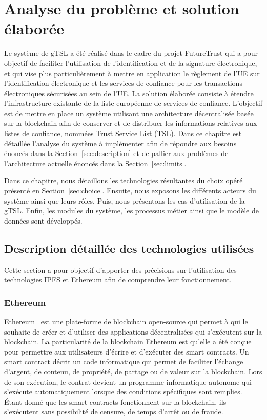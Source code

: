 \documentclass{tnreport}
\begin{document}
\chapter{Analyse du problème et solution élaborée}
\label{chap:analyse}

Le système de gTSL a été réalisé dans le cadre du projet FutureTrust qui a pour objectif de faciliter l'utilisation de l'identification et de la signature électronique, et qui vise plus particulièrement à mettre en application le règlement de l'UE sur l'identification électronique et les services de confiance pour les transactions électroniques sécurisées au sein de l'UE.
La solution élaborée consiste à étendre l'infrastructure existante de la liste européenne de services de confiance. L'objectif est de mettre en place un système utilisant une architecture décentralisée basée sur la blockchain afin de conserver et de distribuer les informations relatives aux listes de confiance, nommées Trust Service List (TSL). Dans ce chapitre est détaillée l'analyse du système à implémenter afin de répondre aux besoins énoncés dans la Section~\ref{sec:description} et de pallier aux problèmes de l'architecture actuelle énoncés dans la Section~\ref{sec:limits}. 

Dans ce chapitre, nous détaillons les technologies résultantes du choix opéré présenté en Section~\ref{sec:choice}. Ensuite, nous exposons les différents acteurs du système ainsi que leurs rôles. Puis, nous présentons les cas d'utilisation de la gTSL. Enfin, les modules du système, les processus métier ainsi que le modèle de données sont développés.

\section{Description détaillée des technologies utilisées}

Cette section a pour objectif d'apporter des précisions sur l'utilisation des technologies IPFS et Ethereum afin de comprendre leur fonctionnement.

\subsection{Ethereum}

Ethereum~\cite{eth} est une plate-forme de blockchain open-source qui permet à qui le souhaite de créer et d'utiliser des applications décentralisées qui s'exécutent sur la blockchain. 
La particularité de la blockchain Ethereum est qu'elle a été conçue pour permettre aux utilisateurs d'écrire et d'exécuter des smart contracts. Un smart contract décrit un code informatique qui permet de faciliter l'échange d'argent, de contenu, de propriété, de partage ou de valeur sur la blockchain.
Lors de son exécution, le contrat devient un programme informatique autonome qui s'exécute automatiquement lorsque des conditions spécifiques sont remplies. Étant donné que les smart contracts fonctionnent sur la blockchain, ils s'exécutent sans possibilité de censure, de temps d'arrêt ou de fraude. 
\end{document}
